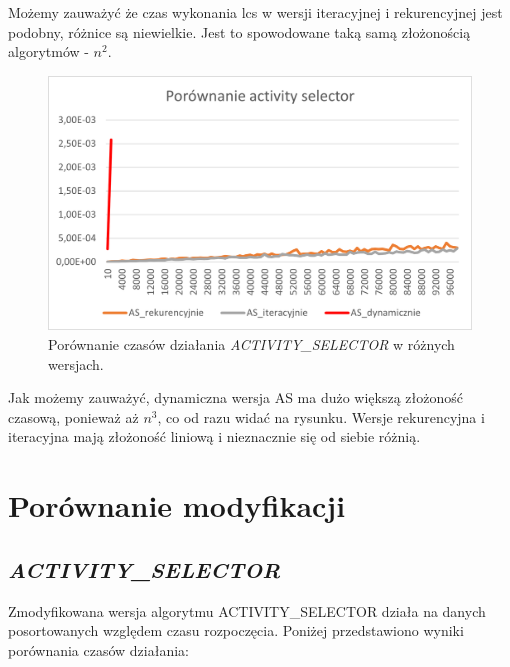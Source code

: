 \documentclass{article}
\begin{document}
	 Możemy zauważyć że czas wykonania lcs w wersji iteracyjnej i rekurencyjnej jest podobny, różnice są niewielkie. Jest to spowodowane taką samą złożonością algorytmów - $n^2$.
	\begin{figure}[H]
		\centering
		\includegraphics[width=\textwidth]{as.png}
		\caption{Porównanie czasów działania \textit{ACTIVITY\_SELECTOR} w różnych wersjach.}
	\end{figure}
	 Jak możemy zauważyć, dynamiczna wersja AS ma dużo większą złożoność czasową, ponieważ aż $n^3$, co od razu widać na rysunku. Wersje rekurencyjna i iteracyjna mają złożoność liniową i nieznacznie się od siebie różnią.
	\section{Porównanie modyfikacji}
	
	\subsection{\textit{ACTIVITY\_SELECTOR}}
	Zmodyfikowana wersja algorytmu ACTIVITY\_SELECTOR działa na danych posortowanych względem czasu rozpoczęcia. Poniżej przedstawiono wyniki porównania czasów działania:
	
\end{document}
